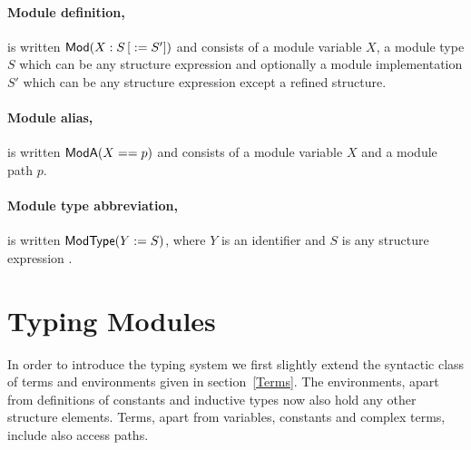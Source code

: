 \paragraph{Module definition,} is written ${\sf Mod}({X}:{S}\,{\sl [}:={S'}{\sl ]})$ and
 consists of a module variable $X$, a module type
$S$ which can be any structure expression and optionally a module implementation $S'$ 
 which can be any structure expression except a refined structure.

\paragraph{Module alias,} is written ${\sf ModA}({X}=={p})$ and
 consists of a module variable $X$ and a module path $p$. 

\paragraph{Module type abbreviation,} is written ${\sf ModType}({Y}:={S})$, where
$Y$ is an identifier and $S$ is any structure expression .


\section{Typing Modules}

In order to introduce the typing system we first slightly extend
the syntactic class of terms and environments given in
section~\ref{Terms}. The environments, apart from definitions of
constants and inductive types now also hold any other structure elements.
Terms, apart from variables, constants and complex terms, 
include also access paths.

